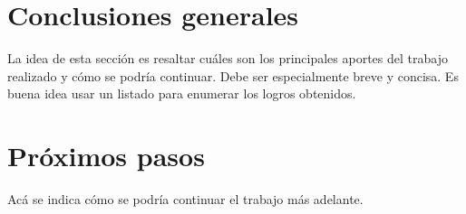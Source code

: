 
\section{Conclusiones generales }

La idea de esta sección es resaltar cuáles son los principales aportes del trabajo realizado y cómo se podría continuar. Debe ser especialmente breve y concisa. Es buena idea usar un listado para enumerar los logros obtenidos.

\section{Próximos pasos}

Acá se indica cómo se podría continuar el trabajo más adelante.
